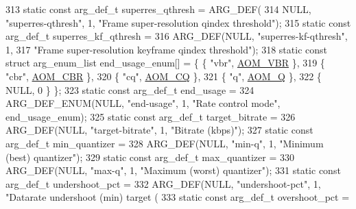 \begin{DoxyCodeInclude}
{{{313 \textcolor{keyword}{static} \textcolor{keyword}{const} arg\_def\_t superres\_qthresh = ARG\_DEF(
314     NULL, \textcolor{stringliteral}{"superres-qthresh"}, 1, \textcolor{stringliteral}{"Frame super-resolution qindex threshold"});
315 \textcolor{keyword}{static} \textcolor{keyword}{const} arg\_def\_t superres\_kf\_qthresh =
316     ARG\_DEF(NULL, \textcolor{stringliteral}{"superres-kf-qthresh"}, 1,
317             \textcolor{stringliteral}{"Frame super-resolution keyframe qindex threshold"});
318 \textcolor{keyword}{static} \textcolor{keyword}{const} \textcolor{keyword}{struct }arg\_enum\_list end\_usage\_enum[] = \{ \{ \textcolor{stringliteral}{"vbr"}, \hyperlink{group__encoder_gga7c084d3ecef569aad166ce70b0e8a957a7d3a2574737ea63d0f160ffdbd7f0110}{AOM\_VBR} \},
319                                                        \{ \textcolor{stringliteral}{"cbr"}, \hyperlink{group__encoder_gga7c084d3ecef569aad166ce70b0e8a957a14b6057d61c61e6117f5af16dcf89b0c}{AOM\_CBR} \},
320                                                        \{ \textcolor{stringliteral}{"cq"}, \hyperlink{group__encoder_gga7c084d3ecef569aad166ce70b0e8a957a70aa1f15e91f6576ba3e63879947be64}{AOM\_CQ} \},
321                                                        \{ \textcolor{stringliteral}{"q"}, \hyperlink{group__encoder_gga7c084d3ecef569aad166ce70b0e8a957aff3bbd4fe870b4b946c2093e59eb14e5}{AOM\_Q} \},
322                                                        \{ NULL, 0 \} \};
323 \textcolor{keyword}{static} \textcolor{keyword}{const} arg\_def\_t end\_usage =
324     ARG\_DEF\_ENUM(NULL, \textcolor{stringliteral}{"end-usage"}, 1, \textcolor{stringliteral}{"Rate control mode"}, end\_usage\_enum);
325 \textcolor{keyword}{static} \textcolor{keyword}{const} arg\_def\_t target\_bitrate =
326     ARG\_DEF(NULL, \textcolor{stringliteral}{"target-bitrate"}, 1, \textcolor{stringliteral}{"Bitrate (kbps)"});
327 \textcolor{keyword}{static} \textcolor{keyword}{const} arg\_def\_t min\_quantizer =
328     ARG\_DEF(NULL, \textcolor{stringliteral}{"min-q"}, 1, \textcolor{stringliteral}{"Minimum (best) quantizer"});
329 \textcolor{keyword}{static} \textcolor{keyword}{const} arg\_def\_t max\_quantizer =
330     ARG\_DEF(NULL, \textcolor{stringliteral}{"max-q"}, 1, \textcolor{stringliteral}{"Maximum (worst) quantizer"});
331 \textcolor{keyword}{static} \textcolor{keyword}{const} arg\_def\_t undershoot\_pct =
332     ARG\_DEF(NULL, \textcolor{stringliteral}{"undershoot-pct"}, 1, \textcolor{stringliteral}{"Datarate undershoot (min) target (%
333 \textcolor{keyword}{static} \textcolor{keyword}{const} arg\_def\_t overshoot\_pct =
}}}}
\end{DoxyCodeInclude}
